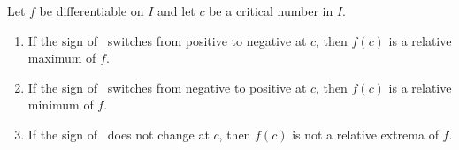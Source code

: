 \setboxwidth{100pt}
%
{Let $f$ be differentiable on $I$ and let $c$ be a critical number in $I$.
\begin{enumerate}
\item		If the sign of \fp\ switches from positive to negative at $c$, then $f(c)$ is a relative maximum of $f$.
\item		If the sign of \fp\ switches from negative to positive at $c$, then $f(c)$ is a relative minimum of $f$.
\item		If the sign of \fp\ does not change at $c$, then $f(c)$ is not a relative extrema of $f$.
\end{enumerate}
}
\normalsize
\restoreboxwidth

